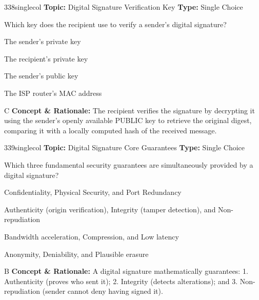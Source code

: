 \begin{qcard}{338}{singlecol}
\textcolor{darkslate!75}{\small\textbf{Topic:} Digital Signature Verification Key \hfill \textbf{Type:} Single Choice}\vspace{0.4em}\par
Which key does the recipient use to verify a sender's digital signature?
\begin{qoptions}
\item The sender's private key
\item The recipient's private key
\item The sender's public key
\item The ISP router's MAC address
\end{qoptions}
\end{qcard}
\nopagebreak
\begin{explainbox}{C}
\textbf{Concept \& Rationale:} The recipient verifies the signature by decrypting it using the sender's openly available PUBLIC key to retrieve the original digest, comparing it with a locally computed hash of the received message.
\end{explainbox}

\begin{qcard}{339}{singlecol}
\textcolor{darkslate!75}{\small\textbf{Topic:} Digital Signature Core Guarantees \hfill \textbf{Type:} Single Choice}\vspace{0.4em}\par
Which three fundamental security guarantees are simultaneously provided by a digital signature?
\begin{qoptions}
\item Confidentiality, Physical Security, and Port Redundancy
\item Authenticity (origin verification), Integrity (tamper detection), and Non-repudiation
\item Bandwidth acceleration, Compression, and Low latency
\item Anonymity, Deniability, and Plausible erasure
\end{qoptions}
\end{qcard}
\nopagebreak
\begin{explainbox}{B}
\textbf{Concept \& Rationale:} A digital signature mathematically guarantees: 1. Authenticity (proves who sent it); 2. Integrity (detects alterations); and 3. Non-repudiation (sender cannot deny having signed it).
\end{explainbox}

